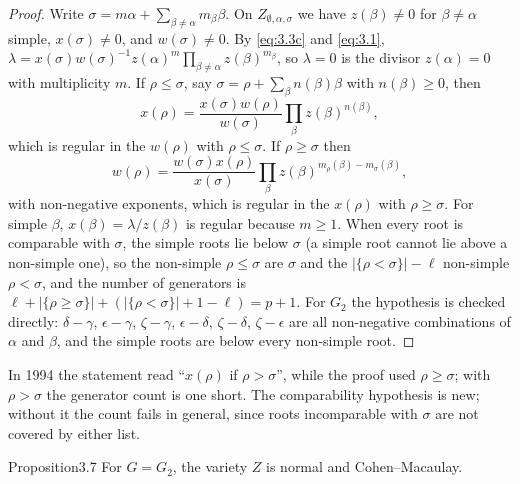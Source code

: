 \documentclass[12pt,letterpaper]{amsart}
\theoremstyle{plain}
\theoremstyle{definition}
\theoremstyle{remark}
\theoremstyle{definition}
\begin{document}
\begin{proof}
Write $\sigma=m\alpha +\sum_{\beta\not= \alpha}m_\beta\beta$. On
$Z_{\emptyset,\alpha,\sigma}$ we have $z(\beta)\not= 0$
for $\beta\not=\alpha$ simple, $x(\sigma)\not= 0$, and
$w(\sigma)\not= 0$. By \eqref{eq:3.3c} and \eqref{eq:3.1},
$\lambda
=x(\sigma)w(\sigma)^{-1}z(\alpha)^m\prod_{\beta\not= \alpha}z(\beta)^{m_\beta}$,
so $\lambda=0$ is the divisor $z(\alpha)=0$
with multiplicity $m$.
If $\rho \leq\sigma$, say $\sigma=\rho +\sum_\beta n(\beta)\beta$ with
$n(\beta)\ge0$, then
\[
x(\rho)=\frac{x(\sigma)w(\rho)}{w(\sigma)}
\prod_\beta z(\beta)^{n(\beta)},
\]
which is regular in the $w(\rho)$ with $\rho \leq\sigma$.
If $\rho\geq\sigma$ then
\[
w(\rho)=\frac{w(\sigma)x(\rho)}{x(\sigma)}\prod_\beta
z(\beta)^{m_\rho(\beta)-m_{\sigma}(\beta)},
\]
with non-negative exponents, which is regular in the $x(\rho)$ with
$\rho \geq\sigma$. For simple $\beta$, $x(\beta)=\lambda/z(\beta)$ is regular
because $m\ge1$. When every root is comparable with $\sigma$, the simple roots
lie below $\sigma$ (a simple root cannot lie above a non-simple one), so the
non-simple $\rho\le\sigma$ are $\sigma$ and the $|\{\rho<\sigma\}|-\ell$
non-simple $\rho<\sigma$, and the number of generators is
$\ell+|\{\rho\ge\sigma\}|+(|\{\rho<\sigma\}|+1-\ell)=p+1$.
For $G_2$ the hypothesis is checked directly: $\delta-\gamma$, $\epsilon-\gamma$,
$\zeta-\gamma$, $\epsilon-\delta$, $\zeta-\delta$, $\zeta-\epsilon$ are all
non-negative combinations of $\alpha$ and $\beta$, and the simple roots are below
every non-simple root.
\end{proof}

\begin{rem26}\label{rem:3.6}
In 1994 the statement read ``$x(\rho)$ if $\rho>\sigma$'', while the proof
used $\rho\geq\sigma$; with $\rho>\sigma$ the generator count is one short.
The comparability hypothesis is new; without it the count fails in general,
since roots incomparable with $\sigma$ are not covered by either list.
\end{rem26}

\begin{res}{Proposition}{3.7}\label{res:3.7}
For $G=G_2$, the variety $Z$ is normal and Cohen--Macaulay.
\end{res}
\end{document}

